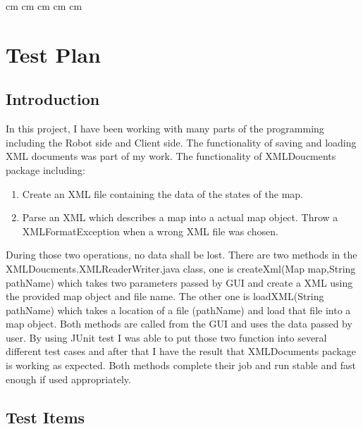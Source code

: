 \documentclass[12pt, a4paper]{report}
\begin{document}
 cm
 cm
 cm
 cm
 cm

\tableofcontents


\clearpage


\chapter{Test Plan}
\label{cha:I}
\section{Introduction}
In this project, I have been working with many parts of the programming including the Robot side and Client side. The functionality of saving and loading XML documents was part of my work. 
The functionality of XMLDoucments package including:
\begin{enumerate}
	\item  Create an XML file containing the data of the states of the map.
	\item  Parse an XML which describes a map into a actual map object. Throw a XMLFormatException when a wrong XML file was chosen.
\end{enumerate}
During those two operations, no data shall be lost.
There are two methods in the XMLDoucments.XMLReaderWriter.java class, one is createXml(Map map,String pathName) which takes two parameters passed by GUI and create a XML using the provided map object and file name. The other one is loadXML(String pathName) which takes a location of a file (pathName) and load that file into a map object.
Both methods are called from the GUI and uses the data passed by user. By using JUnit test I was able to put those two function into several different test cases and after that I have the result that XMLDocuments package is working as expected. Both methods complete their job and run stable and fast enough if used appropriately.


\section{Test Items}
\end{document}
